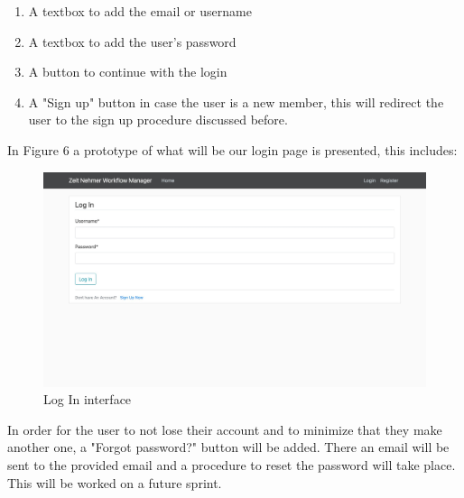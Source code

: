 \documentclass{article}[draft]
\begin{document}
  \begin{enumerate}
    \item A textbox to add the email or username
    \item A textbox to add the user's password
    \item A button to continue with the login
    \item A "Sign up" button in case the user is a new member, this will redirect the user to the sign up procedure discussed before.
  \end{enumerate}
In Figure 6 a prototype of what will be our login page is presented, this includes:
  \begin{figure}[h!]
      \centering
      \includegraphics[width=1.2\columnwidth]{Images/LogIn.jpg}
      \caption{Log In interface}
      \label{fig:figure 4}
  \end{figure}

  In order for the user to not lose their account and to minimize that they make another one, a "Forgot password?" button will be added. There an email will be sent to the provided email and a procedure to reset the password will take place. This will be worked on a future sprint.
\end{document}
